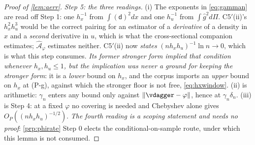 \begin{proof}[Proof of \cref{lem:aerr}]
\emph{Step 5: the three readings.} (i) The exponents in \eqref{eq:gamman} are read off Step 1: one
$h_x^{-1}$ from $\int(\mathsf d)^{2}dx$ and one $h_u^{-1}$ from
$\int\hat g^{2}d\Pi$. C5$'$(ii)'s $h_x^{2}h_u^{3}$ would be the correct pairing for an estimator of a
\emph{derivative} of a density in $x$ and a \emph{second} derivative in $u$, which is what the
cross-sectional companion estimates; $\hat{\mathcal A}_\varphi$ estimates neither. C5$'$(ii) now
\emph{states} $(nh_xh_u)^{-1}\ln n\to0$, which is what this step consumes. \emph{Its former stronger form
implied that condition whenever $h_x,h_u\le1$, but the implication was never a ground for keeping the
stronger form}: it is a \emph{lower} bound on $h_x$, and the corpus imports an \emph{upper} bound on $h_x$
at (P-g), against which the stronger floor is not free, \eqref{eq:hxwindow}.
(ii) is arithmetic: $\gamma_n$ enters any bound only against $\|\vdagger-\varphi\|$, hence at
$\gamma_n\delta_n$. (iii) is Step 4: at a fixed $\varphi$ no covering is needed and Chebyshev alone
gives $O_P((nh_xh_u)^{-1/2})$. \emph{The fourth reading is a scoping statement and needs no proof}:
\cref{prp:phirate} Step 0 elects the conditional-on-sample route, under which this lemma is not
consumed.
\end{proof}

